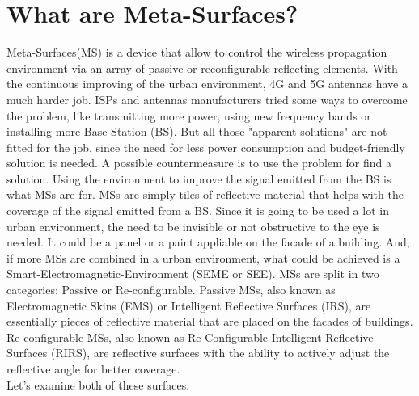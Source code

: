 \section{What are Meta-Surfaces?}
\label{sec:what-meta-surface}
Meta-Surfaces(MS) is a device that allow to control the wireless propagation environment via an array of passive or reconfigurable reflecting elements. With the continuous improving of the urban environment, 4G and 5G antennas have a much harder job. ISPs and antennas manufacturers tried some ways to overcome the problem, like transmitting more power, using new frequency bands or installing more Base-Station (BS). But all those "apparent solutions" are not fitted for the job, since the need for less power consumption and budget-friendly solution is needed. A possible countermeasure is to use the problem for find a solution. Using the environment to improve the signal emitted from the BS is what MSs are for. MSs are simply tiles of reflective material that helps with the coverage of the signal emitted from a BS. Since it is going to be used a lot in urban environment, the need to be invisible or not obstructive to the eye is needed. It could be a panel or a paint appliable on the facade of a building. And, if more MSs are combined in a urban environment, what could be achieved is a Smart-Electromagnetic-Environment (SEME or SEE). MSs are split in two categories: Passive or Re-configurable. Passive MSs, also known as Electromagnetic Skins (EMS) or Intelligent Reflective Surfaces (IRS), are essentially pieces of reflective material that are placed on the facades of buildings. Re-configurable MSs, also known as Re-Configurable Intelligent Reflective Surfaces (RIRS), are reflective surfaces with the ability to actively adjust the reflective angle for better coverage. \\
Let’s examine both of these surfaces.
